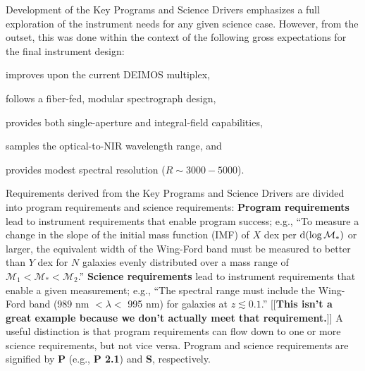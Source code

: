 \documentclass[11pt,a4paper,twoside,onecolumn,openany,final,oldfontcommands]{memoir}
\newcommand{\edit}[2][todo]{{\color{#1}[[{\bf #2}]]}}
\begin{document}
Development of the Key Programs and Science Drivers emphasizes a full exploration of the instrument needs for any given science case.  However, from the outset, this was done within the context of the following gross expectations for the final instrument design:
%
\begin{asparaenum}
\item improves upon the current DEIMOS multiplex,
\item follows a fiber-fed, modular spectrograph design,
\item provides both single-aperture and integral-field capabilities,
\item samples the optical-to-NIR wavelength range, and
\item provides modest spectral resolution ($R\sim 3000-5000$).
\end{asparaenum}


Requirements derived from the Key Programs and Science Drivers are divided into program requirements and science requirements:  {\bf Program requirements} lead to instrument requirements that enable program success; e.g., ``To measure a change in the slope of the initial mass function (IMF) of $X$ dex per ${\rm d}(\log\mathcal{M}_\ast)$ or larger, the equivalent width of the Wing-Ford band must be measured to better than $Y$ dex for $N$ galaxies evenly distributed over a mass range of $\mathcal{M}_1 < \mathcal{M}_\ast < \mathcal{M}_2$.''  {\bf Science requirements} lead to instrument requirements that enable a given measurement; e.g., ``The spectral range must include the Wing-Ford band (989 nm $< \lambda <$ 995 nm) for galaxies at $z \lesssim 0.1$.''  \edit{This isn't a great example because we don't actually meet that requirement.}  A useful distinction is that program requirements can flow down to one or more science requirements, but not vice versa. Program and science requirements are signified by {\bf P} (e.g., {\bf P 2.1}) and {\bf S}, respectively.
\end{document}
